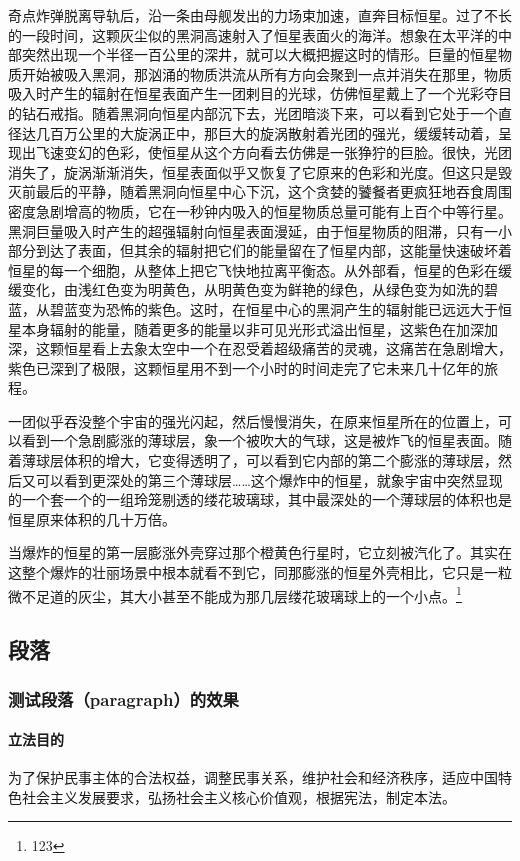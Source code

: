 奇点炸弹脱离导轨后，沿一条由母舰发出的力场束加速，直奔目标恒星。过了不长的一段时间，这颗灰尘似的黑洞高速射入了恒星表面火的海洋。想象在太平洋的中部突然出现一个半径一百公里的深井，就可以大概把握这时的情形。巨量的恒星物质开始被吸入黑洞，那汹涌的物质洪流从所有方向会聚到一点并消失在那里，物质吸入时产生的辐射在恒星表面产生一团剌目的光球，仿佛恒星戴上了一个光彩夺目的钻石戒指。随着黑洞向恒星内部沉下去，光团暗淡下来，可以看到它处于一个直径达几百万公里的大旋涡正中，那巨大的旋涡散射着光团的强光，缓缓转动着，呈现出飞速变幻的色彩，使恒星从这个方向看去仿佛是一张狰狞的巨脸。很快，光团消失了，旋涡渐渐消失，恒星表面似乎又恢复了它原来的色彩和光度。但这只是毁灭前最后的平静，随着黑洞向恒星中心下沉，这个贪婪的饕餐者更疯狂地吞食周围密度急剧增高的物质，它在一秒钟内吸入的恒星物质总量可能有上百个中等行星。黑洞巨量吸入时产生的超强辐射向恒星表面漫延，由于恒星物质的阻滞，只有一小部分到达了表面，但其余的辐射把它们的能量留在了恒星内部，这能量快速破坏着恒星的每一个细胞，从整体上把它飞快地拉离平衡态。从外部看，恒星的色彩在缓缓变化，由浅红色变为明黄色，从明黄色变为鲜艳的绿色，从绿色变为如洗的碧蓝，从碧蓝变为恐怖的紫色。这时，在恒星中心的黑洞产生的辐射能已远远大于恒星本身辐射的能量，随着更多的能量以非可见光形式溢出恒星，这紫色在加深加深，这颗恒星看上去象太空中一个在忍受着超级痛苦的灵魂，这痛苦在急剧增大，紫色已深到了极限，这颗恒星用不到一个小时的时间走完了它未来几十亿年的旅程。

一团似乎吞没整个宇宙的强光闪起，然后慢慢消失，在原来恒星所在的位置上，可以看到一个急剧膨涨的薄球层，象一个被吹大的气球，这是被炸飞的恒星表面。随着薄球层体积的增大，它变得透明了，可以看到它内部的第二个膨涨的薄球层，然后又可以看到更深处的第三个薄球层……这个爆炸中的恒星，就象宇宙中突然显现的一个套一个的一组玲笼剔透的缕花玻璃球，其中最深处的一个薄球层的体积也是恒星原来体积的几十万倍。

当爆炸的恒星的第一层膨涨外壳穿过那个橙黄色行星时，它立刻被汽化了。其实在这整个爆炸的壮丽场景中根本就看不到它，同那膨涨的恒星外壳相比，它只是一粒微不足道的灰尘，其大小甚至不能成为那几层缕花玻璃球上的一个小点。\footnote{123}

\subsection{段落}

\subsubsection{测试段落（paragraph）的效果}

\paragraph{立法目的} 
为了保护民事主体的合法权益，调整民事关系，维护社会和经济秩序，适应中国特色社会主义发展要求，弘扬社会主义核心价值观，根据宪法，制定本法。

